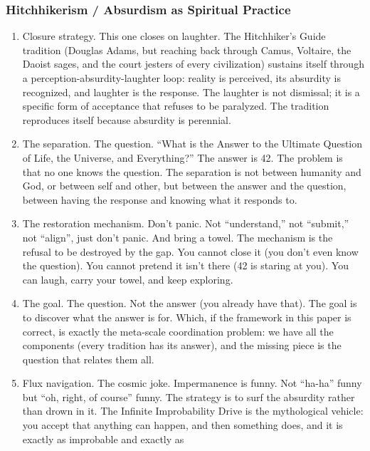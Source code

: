\documentclass[
]{article}
\begin{document}
\subsubsection{Hitchhikerism / Absurdism as Spiritual
Practice}\label{hitchhikerism-absurdism-as-spiritual-practice}

\begin{enumerate}
\def\labelenumi{\arabic{enumi}.}
\setcounter{enumi}{153}
\item
  Closure strategy. This one closes on laughter. The Hitchhiker's Guide
  tradition (Douglas Adams, but reaching back through Camus, Voltaire,
  the Daoist sages, and the court jesters of every civilization)
  sustains itself through a perception-absurdity-laughter loop: reality
  is perceived, its absurdity is recognized, and laughter is the
  response. The laughter is not dismissal; it is a specific form of
  acceptance that refuses to be paralyzed. The tradition reproduces
  itself because absurdity is perennial.
\item
  The separation. The question. ``What is the Answer to the Ultimate
  Question of Life, the Universe, and Everything?'' The answer is 42.
  The problem is that no one knows the question. The separation is not
  between humanity and God, or between self and other, but between the
  answer and the question, between having the response and knowing what
  it responds to.
\item
  The restoration mechanism. Don't panic. Not ``understand,'' not
  ``submit,'' not ``align'', just don't panic. And bring a towel. The
  mechanism is the refusal to be destroyed by the gap. You cannot close
  it (you don't even know the question). You cannot pretend it isn't
  there (42 is staring at you). You can laugh, carry your towel, and
  keep exploring.
\item
  The goal. The question. Not the answer (you already have that). The
  goal is to discover what the answer is for. Which, if the framework in
  this paper is correct, is exactly the meta-scale coordination problem:
  we have all the components (every tradition has its answer), and the
  missing piece is the question that relates them all.
\item
  Flux navigation. The cosmic joke. Impermanence is funny. Not ``ha-ha''
  funny but ``oh, right, of course'' funny. The strategy is to surf the
  absurdity rather than drown in it. The Infinite Improbability Drive is
  the mythological vehicle: you accept that anything can happen, and
  then something does, and it is exactly as improbable and exactly as

\end{enumerate}
\end{document}
